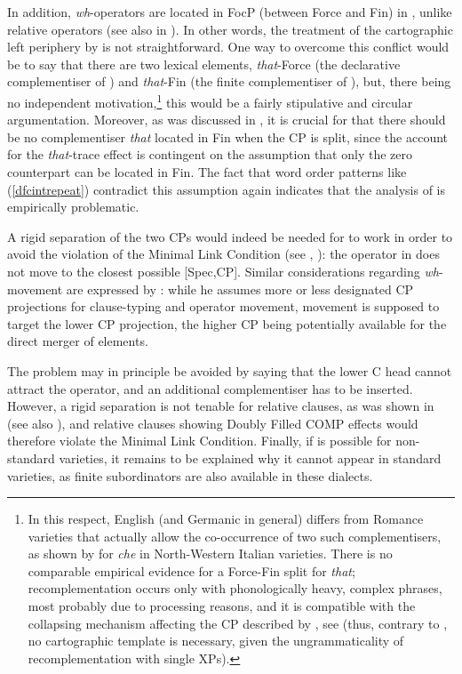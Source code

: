 In addition, \textit{wh}-operators are located in FocP (between Force and Fin) in \citet{rizzi1997}, unlike relative operators (see also in ). In other words, the treatment of the cartographic left periphery by \citet{baltin2010} is not straightforward. One way to overcome this conflict would be to say that there are two lexical elements, \textit{that}-Force (the declarative complementiser of \citealt{rizzi1997}) and \textit{that}-Fin (the finite complementiser of \citealt{baltin2010}), but, there being no independent motivation,\footnote{In this respect, English (and Germanic in general) differs from Romance varieties that actually allow the co-occurrence of two such complementisers, as shown by \citet{paoli2009} for \textit{che} in North-Western Italian varieties. There is no comparable empirical evidence for a Force-Fin split for \textit{that}; recomplementation occurs only with phonologically heavy, complex phrases, most probably due to processing reasons, and it is compatible with the collapsing mechanism affecting the CP described by \citet{sobin2002}, see  (thus, contrary to \citealt{villagarcia2019}, no cartographic template is necessary, given the ungrammaticality of recomplementation with single XPs).} this would be a fairly stipulative and circular argumentation. Moreover, as was discussed in , it is crucial for \citet{rizzi1997} that there should be no complementiser \textit{that} located in Fin when the CP is split, since the account for the \textit{that}-trace effect is contingent on the assumption that only the zero counterpart can be located in Fin. The fact that word order patterns like (\ref{dfcintrepeat}) contradict this assumption again indicates that the analysis of \citet{rizzi1997} is empirically problematic.

A rigid separation of the two CPs would indeed be needed for  to work in order to avoid the violation of the Minimal Link Condition (see \citealt{fanselow1990, fanselow1991}, \citealt{chomsky1995}): the operator in  does not move to the closest possible [Spec,CP]. Similar considerations regarding \textit{wh}-movement are expressed by \citet[241--243]{vancraenenbroeck2010}: while he assumes more or less designated CP projections for clause-typing and operator movement, movement is supposed to target the lower CP projection, the higher CP being potentially available for the direct merger of elements.

The problem may in principle be avoided by saying that the lower C head cannot attract the operator, and an additional complementiser has to be inserted. However, a rigid separation is not tenable for relative clauses, as was shown in  (see also ), and relative clauses showing Doubly Filled COMP effects would therefore violate the Minimal Link Condition. Finally, if  is possible for non-standard varieties, it remains to be explained why it cannot appear in standard varieties, as finite subordinators are also available in these dialects.

